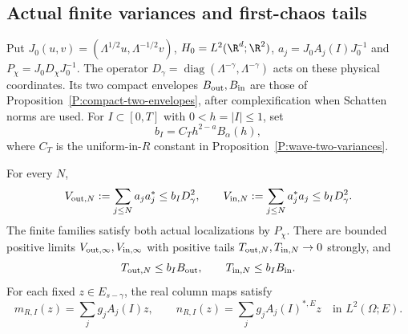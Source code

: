 \subsection{Actual finite variances and first-chaos tails}

Put $J_0(u,v)=(\Lambda^{1/2}u,\Lambda^{-1/2}v)$,
$H_0=L^2(\R^d;\R^2)$, $a_j=J_0A_j(I)J_0^{-1}$ and
$P_\chi=J_0D_\chi J_0^{-1}$. The operator
$D_\gamma=\operatorname{diag}(\Lambda^{-\gamma},\Lambda^{-\gamma})$
acts on these physical coordinates. Its two compact envelopes
$B_{\rm out},B_{\rm in}$ are those of
Proposition~\ref{P:compact-two-envelopes}, after complexification when
Schatten norms are used. For $I\subset[0,T]$ with $0<h=|I|\le1$, set
\begin{equation}\label{E:driver-short-variance-budget}
  b_I=C_T h^{2-a}B_\alpha(h),
\end{equation}
where $C_T$ is the uniform-in-$R$ constant in
Proposition~\ref{P:wave-two-variances}.

\begin{lemma}\label{L:driver-actual-variances}
  For every $N$,
  \begin{equation}\label{E:driver-two-variances}
    V_{{\rm out},N}:=\sum_{j\le N}a_ja_j^*\le b_ID_\gamma^2,
    \qquad V_{{\rm in},N}:=\sum_{j\le N}a_j^*a_j\le b_ID_\gamma^2.
  \end{equation}
  The finite families satisfy both actual localizations by $P_\chi$.
  There are bounded positive limits $V_{{\rm out},\infty},V_{{\rm in},\infty}$
  with positive tails $T_{{\rm out},N},T_{{\rm in},N}\to0$ strongly, and
  \begin{equation}\label{E:driver-compact-tail-envelopes}
    T_{{\rm out},N}\le b_IB_{\rm out},\qquad
    T_{{\rm in},N}\le b_IB_{\rm in}.
  \end{equation}
  For each fixed $z\in E_{s-\gamma}$, the real column maps satisfy
  \begin{equation}\label{E:driver-column-expansions}
    m_{R,I}(z)=\sum_jg_jA_j(I)z,\qquad
    n_{R,I}(z)=\sum_jg_jA_j(I)^{*,E}z
    \quad\text{in }L^2(\Omega;E).
  \end{equation}
\end{lemma}

